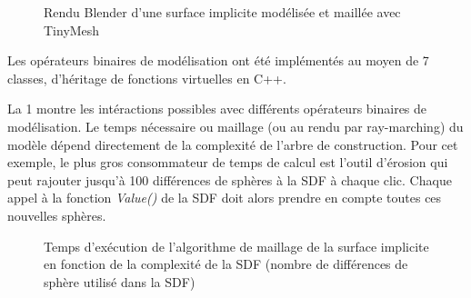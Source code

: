 \begin{figure}[h!]

	\caption{Rendu Blender d'une surface implicite modélisée et maillée avec TinyMesh}
	\label{ref}
\end{figure}
\FloatBarrier

Les opérateurs binaires de modélisation ont été implémentés au moyen de 7 classes, d'héritage de fonctions virtuelles en C++.

La \figurename 1 montre les intéractions possibles avec différents opérateurs binaires de modélisation. Le temps nécessaire ou maillage (ou au rendu par ray-marching) du modèle
dépend directement de la complexité de l'arbre de construction. Pour cet exemple, le plus gros consommateur de temps de calcul est l'outil d'érosion qui peut rajouter jusqu'à
100 différences de sphères à la SDF à chaque clic. Chaque appel à la fonction \textit{Value()} de la SDF doit alors prendre en compte toutes ces nouvelles sphères.

\begin{figure}[h!]

	\caption{Temps d'exécution de l'algorithme de maillage de la surface implicite en fonction de la complexité de la SDF (nombre de différences de sphère utilisé dans la SDF)}
\end{figure}
\FloatBarrier

